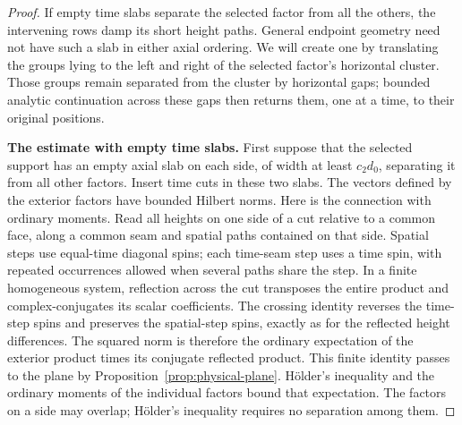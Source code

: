 \begin{proof}
If empty time slabs separate the selected factor from all the others,
the intervening rows damp its short height paths. General endpoint
geometry need not have such a slab in either axial ordering. We will
create one by translating the groups lying to the left and right of
the selected factor's horizontal cluster. Those groups remain separated
from the cluster by horizontal gaps; bounded analytic continuation
across these gaps then returns them, one at a time, to their original
positions.

\smallskip\noindent\textbf{The estimate with empty time slabs.}
First suppose that the selected support has an empty axial slab on each
side, of width at least \(c_2d_0\), separating it from all other factors.
Insert time cuts in these two slabs.
The vectors defined by the exterior factors have bounded Hilbert norms.
Here is the connection with ordinary moments. Read all heights on one
side of a cut relative to a common face, along a common seam and spatial
paths contained on that side. Spatial steps use equal-time diagonal
spins; each time-seam step uses a time spin, with repeated occurrences
allowed when several paths share the step. In a finite homogeneous
system, reflection across the cut transposes the entire product and
complex-conjugates its scalar coefficients. The crossing identity
reverses the time-step spins and preserves the spatial-step spins,
exactly as for the reflected height differences. The squared norm is
therefore the ordinary expectation of the exterior product times its
conjugate reflected product. This finite identity passes to the plane
by Proposition~\ref{prop:physical-plane}. Hölder's inequality and the
ordinary moments of the individual factors bound that expectation.
The factors on a side may overlap; Hölder's inequality requires no
separation among them.


\end{proof}
